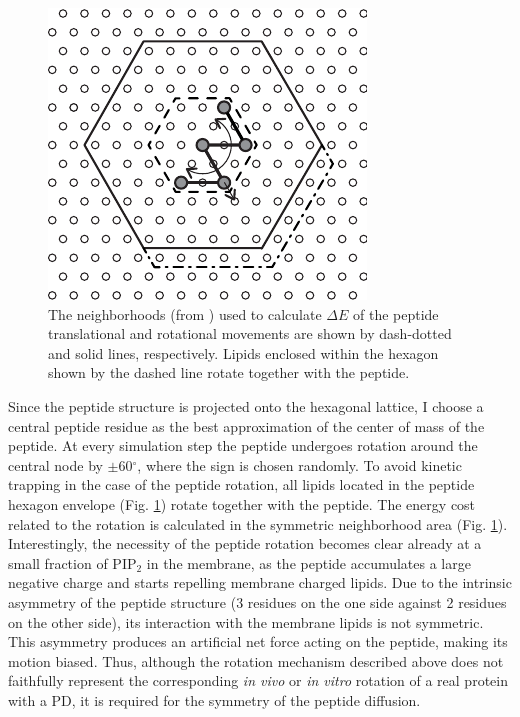 \begin{figure}[!ht]
\begin{center}
  \includegraphics[scale=1.8]{../figures/peptide_neighborhood.pdf}
\end{center}
 \caption[The neighborhoods used to calculate $\Delta E$ of the peptide translational and rotational movements]{The neighborhoods (from \cite{Kiselev2011}) used to calculate $\Delta E$ of the peptide translational and rotational movements are shown by dash-dotted and solid lines, respectively. Lipids enclosed within the hexagon shown by the dashed line rotate together with the peptide.}
\label{fig:peptide_neighborhood}
\end{figure}

Since the peptide structure is projected onto the hexagonal lattice, I choose a central peptide residue as the best approximation of the center of mass of the peptide. At every simulation step the peptide undergoes rotation around the central node by $\pm$60$^\circ$, where the sign is chosen randomly. To avoid kinetic trapping in the case of the peptide rotation, all lipids located in the peptide hexagon envelope (Fig. \ref{fig:peptide_neighborhood}) rotate together with the peptide. The energy cost related to the rotation is calculated in the symmetric neighborhood area (Fig. \ref{fig:peptide_neighborhood}). Interestingly, the necessity of the peptide rotation becomes clear already at a small fraction of PIP$_2$ in the membrane, as the peptide accumulates a large negative charge and starts repelling membrane charged lipids. Due to the intrinsic asymmetry of the peptide structure (3 residues on the one side against 2 residues on the other side), its interaction with the membrane lipids is not symmetric. This asymmetry produces an artificial net force acting on the peptide, making its motion biased. Thus, although the rotation mechanism described above does not faithfully represent the corresponding \emph{in vivo} or \emph{in vitro} rotation of a real protein with a PD, it is required for the symmetry of the peptide diffusion. 

